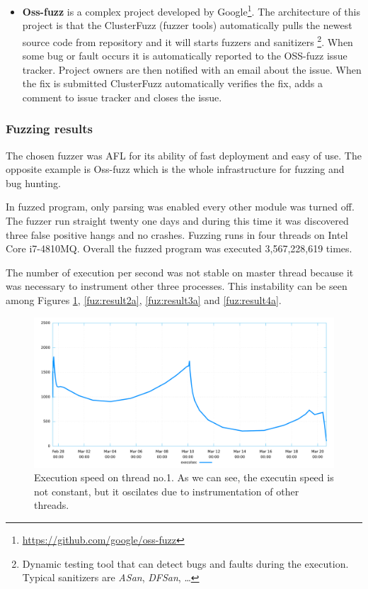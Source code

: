 \begin{itemize}
	\item \textbf{Oss-fuzz} is a complex project developed by Google\footnote{\url{https://github.com/google/oss-fuzz}}.
	The architecture of this project is that the ClusterFuzz (fuzzer tools)
	automatically pulls the newest source code from repository and it will starts
	fuzzers and sanitizers \footnote{Dynamic testing tool that can detect bugs and
	faults during the execution. Typical sanitizers are \textit{ASan},
	\textit{DFSan}, \ldots}. When some bug or fault occurs it is automatically
	reported to the OSS-fuzz issue tracker. Project owners are then notified with
	an email about the issue. When the fix is submitted ClusterFuzz automatically
	verifies the fix, adds a comment to issue tracker and closes the issue.

\end{itemize}


\subsubsection{Fuzzing results}
The chosen fuzzer was AFL for its ability of fast deployment and easy of use.
The opposite example is Oss-fuzz which is the whole infrastructure for fuzzing and bug hunting.

In fuzzed program, only parsing was enabled every other module was turned off.
The fuzzer run straight twenty one days and during this time it was discovered
three false positive hangs and no crashes. Fuzzing runs in four threads on Intel
Core i7-4810MQ. Overall the fuzzed program was executed 3,567,228,619 times.

The number of execution per second was not stable on master thread because it
was necessary to instrument other three processes. This instability can be
seen among Figures \ref{fuz:result1a}, \ref{fuz:result2a}, \ref{fuz:result3a}
and \ref{fuz:result4a}.

\begin{figure}[H]
	\centering
	\includegraphics[width=0.8\linewidth]{obrazky-figures/master/exec_speed.pdf}
	\caption{Execution speed on thread no.1. As we can see, the executin speed
	is not constant, but it oscilates due to instrumentation of other threads. }
	\label{fuz:result1a}
\end{figure}

